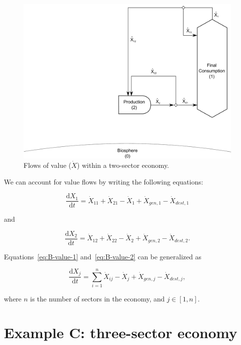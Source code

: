 \begin{figure}[!ht]
\centering
\includegraphics[width=0.8\linewidth]{Part_2/Chapter_Values/images/2_sector_value.pdf}
\caption[Flows of value within a two-sector economy.]{Flows of value ($\dot{X}$) within a two-sector economy.}
\label{fig:B_value}
\end{figure}

We can account for value flows by writing
the following equations:

\begin{equation}\label{eq:B-value-1}
	\frac{\mathrm{d}X_{1}}{\mathrm{d}t}
	= \dot{X}_{11}
	+ \dot{X}_{21}
	- \dot{X}_{1}
	+ \dot{X}_{gen,1}
	- \dot{X}_{dest,1}
\end{equation}

\noindent{}and

\begin{equation}\label{eq:B-value-2}
	\frac{\mathrm{d}X_{2}}{\mathrm{d}t}
	= \dot{X}_{12}
	+ \dot{X}_{22}
	- \dot{X}_{2}
	+ \dot{X}_{gen,2}
	- \dot{X}_{dest,2}.
\end{equation}

Equations~\ref{eq:B-value-1} and~\ref{eq:B-value-2}
can be generalized as

\begin{equation}\label{eq:B-value-generalized}
	\frac{\mathrm{d}X_{j}}{\mathrm{d}t}
	= \sum\limits_{i=1}^n \dot{X}_{ij}
	- \dot{X}_{j}
	+ \dot{X}_{gen,j}
	- \dot{X}_{dest,j},
\end{equation}

\noindent{}where $n$ is the number of sectors in the economy, and $j \in [1, n]$.


\section{Example C: three-sector economy} %

